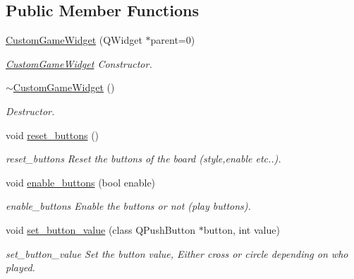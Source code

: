 \subsection*{Public Member Functions}
\begin{DoxyCompactItemize}
\item 
\hyperlink{class_custom_game_widget_a1c85b1e714a238a7afbcbb8dfa28f0b1}{Custom\+Game\+Widget} (Q\+Widget $\ast$parent=0)
\begin{DoxyCompactList}\small\item\em \hyperlink{class_custom_game_widget}{Custom\+Game\+Widget} Constructor. \end{DoxyCompactList}\item 
\mbox{\label{class_custom_game_widget_a43b0436fa948b2b44009fe2e656ac3e0}} 
\hyperlink{class_custom_game_widget_a43b0436fa948b2b44009fe2e656ac3e0}{$\sim$\+Custom\+Game\+Widget} ()
\begin{DoxyCompactList}\small\item\em Destructor. \end{DoxyCompactList}\item 
\mbox{\label{class_custom_game_widget_aa9e4d0f12c9070a0e432631754f8913a}} 
void \hyperlink{class_custom_game_widget_aa9e4d0f12c9070a0e432631754f8913a}{reset\+\_\+buttons} ()
\begin{DoxyCompactList}\small\item\em reset\+\_\+buttons Reset the buttons of the board (style,enable etc..). \end{DoxyCompactList}\item 
void \hyperlink{class_custom_game_widget_abd589dcb5502f401773de7f1d349954a}{enable\+\_\+buttons} (bool enable)
\begin{DoxyCompactList}\small\item\em enable\+\_\+buttons Enable the buttons or not (play buttons). \end{DoxyCompactList}\item 
void \hyperlink{class_custom_game_widget_ae34e750a94a537ee435aa31311b5f495}{set\+\_\+button\+\_\+value} (class Q\+Push\+Button $\ast$button, int value)
\begin{DoxyCompactList}\small\item\em set\+\_\+button\+\_\+value Set the button value, Either cross or circle depending on who played. \end{DoxyCompactList}\end{DoxyCompactItemize}


